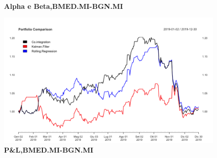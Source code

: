 \documentclass[]{article}
\begin{document}
\
\\
\begin{figure}[htp]
	\begin{center}
		
		
		
		\caption{\textbf{Alpha e Beta,BMED.MI-BGN.MI}}
		
	\end{center}
\end{figure}


\begin{figure}
	\centering
	\includegraphics[scale=0.3]{bmed_bgn_portfolio.png}
	\caption{\textbf{P\&L,BMED.MI-BGN.MI}}
	\label{portfolio_bmed_bgn}
\end{figure}
\end{document}
